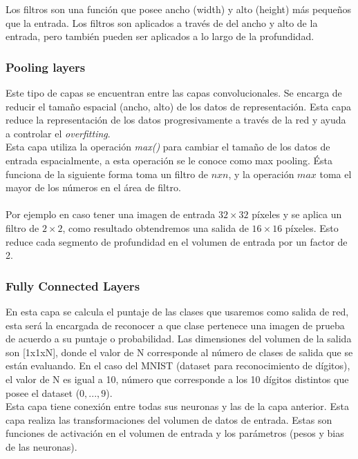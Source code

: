 Los filtros son una función que posee ancho (width) y alto (height) más pequeños que la entrada. Los filtros son aplicados a través de  del ancho y alto de la entrada, pero también pueden ser aplicados a lo largo de la profundidad.

\vspace{5cm}


\subsubsection{Pooling layers}
Este tipo de capas se encuentran entre las capas convolucionales. Se encarga de reducir el tamaño espacial (ancho, alto) de los datos de representación. Esta capa reduce la representación de los datos progresivamente a través de la red y ayuda a controlar el \textit{overfitting}.\\
Esta capa utiliza la operación \textit{max()} para cambiar el tamaño de los datos de entrada espacialmente, a esta operación se le conoce como max pooling. Ésta funciona de la siguiente forma toma un filtro de $n x n$, y la operación $max$ toma el mayor de los números en el área de filtro.\\ \\ Por ejemplo en caso tener una imagen de entrada $32 \times 32$ píxeles y se aplica un filtro de $2\times2$, como resultado obtendremos una salida de $16\times16$ píxeles. Esto reduce cada segmento de profundidad en el volumen de entrada por un factor de 2.

\subsubsection{Fully Connected Layers}

En esta capa se calcula el puntaje de las clases que usaremos como salida de red, esta será la encargada de reconocer a que clase pertenece una imagen de prueba de acuerdo a su puntaje o probabilidad. Las dimensiones del volumen de la salida son [1x1xN], donde el valor de N corresponde al número de clases de salida que se están evaluando. En el caso del MNIST (dataset para reconocimiento de dígitos), el valor de N es igual a 10, número que corresponde a los 10 dígitos distintos que posee el dataset ($0, ... ,9$).\\
Esta capa tiene conexión entre todas sus neuronas y las de la capa anterior. Esta capa realiza las transformaciones del volumen de datos de entrada. Estas son funciones de activación en el volumen de entrada y los parámetros (pesos y bias de las neuronas).
\vspace{2cm}


